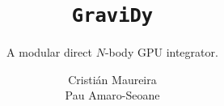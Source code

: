 \documentclass{beamer}
\author[C. Maureira and P. Amaro-Seoane]
       {\large Cristián Maureira\\
        \large Pau Amaro-Seoane}
\title[GraviDy]
      {\huge \texttt{GraviDy}}
\subtitle{\large A modular direct $N$-body GPU integrator.}
\institute[AEI]
          {Albert Einstein Institute}
\begin{document}


\begin{frame}[t,plain]
    \titlepage
\end{frame}





%
%

\begin{frame}[t,plain]
\titlepage
\end{frame}

\begin{frame}[fragile]
\scriptsize

\end{frame}
\end{document}
